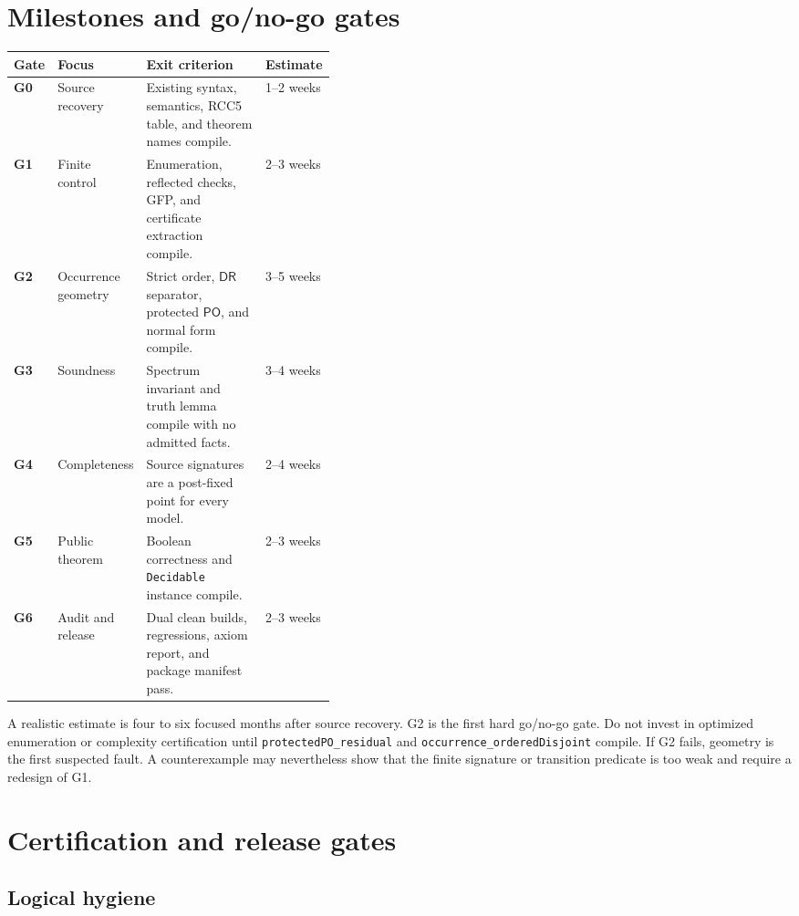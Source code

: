 \documentclass[11pt]{article}
\newcommand{\PO}{\mathsf{PO}}
\newcommand{\DR}{\mathsf{DR}}
\begin{document}
\section{Milestones and go/no-go gates}

\begin{center}
\renewcommand{\arraystretch}{1.25}
\begin{tabularx}{\linewidth}{>{\bfseries}p{0.10\linewidth}p{0.18\linewidth}Xp{0.13\linewidth}}
\toprule
Gate & Focus & Exit criterion & Estimate \\
\midrule
G0 & Source recovery & Existing syntax, semantics, RCC5 table, and theorem names compile. &
1--2 weeks \\
G1 & Finite control & Enumeration, reflected checks, GFP, and certificate extraction compile. &
2--3 weeks \\
G2 & Occurrence geometry & Strict order, $\DR$ separator, protected $\PO$, and normal form compile. &
3--5 weeks \\
G3 & Soundness & Spectrum invariant and truth lemma compile with no admitted facts. &
3--4 weeks \\
G4 & Completeness & Source signatures are a post-fixed point for every model. &
2--4 weeks \\
G5 & Public theorem & Boolean correctness and \texttt{Decidable} instance compile. &
2--3 weeks \\
G6 & Audit and release & Dual clean builds, regressions, axiom report, and package manifest pass. &
2--3 weeks \\
\bottomrule
\end{tabularx}
\end{center}

A realistic estimate is four to six focused months after source recovery. G2 is the first
hard go/no-go gate. Do not invest in optimized enumeration or complexity certification
until \texttt{protectedPO\_residual} and \texttt{occurrence\_orderedDisjoint} compile.
If G2 fails, geometry is the first suspected fault. A counterexample may nevertheless
show that the finite signature or transition predicate is too weak and require a redesign
of G1.

\section{Certification and release gates}\label{sec:audit}

\subsection{Logical hygiene}
\end{document}

